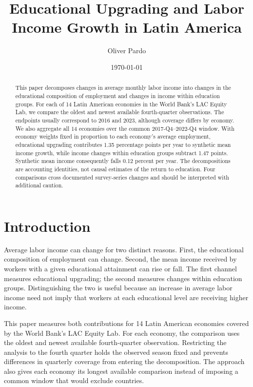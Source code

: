 \documentclass[11pt]{article}
\title{Educational Upgrading and Labor Income Growth in Latin America}
\author{Oliver Pardo}
\date{\today}
\begin{document}
\maketitle

\begin{abstract}
This paper decomposes changes in average monthly labor income into changes in
the educational composition of employment and changes in income within
education groups. For each of 14 Latin American economies in the World Bank's
LAC Equity Lab, we compare the oldest and newest available fourth-quarter
observations. The endpoints usually correspond to 2016 and 2023, although
coverage differs by economy. We also aggregate all 14 economies over the
common 2017-Q4--2022-Q4 window. With economy weights
fixed in proportion to each economy's average employment, educational upgrading contributes 1.35 percentage points
per year to synthetic mean income growth, while income changes within
education groups subtract 1.47 points. Synthetic mean income consequently
falls 0.12 percent per year. The decompositions are accounting identities,
not causal estimates of the return to education. Four comparisons cross
documented survey-series changes and should be interpreted with additional
caution.
\end{abstract}

\section{Introduction}

Average labor income can change for two distinct reasons. First, the
educational composition of employment can change. Second, the mean income
received by workers with a given educational attainment can rise or fall.
The first channel measures educational upgrading; the second measures changes
within education groups. Distinguishing the two is useful because an increase
in average labor income need not imply that workers at each educational level
are receiving higher income.

This paper measures both contributions for 14 Latin American economies
covered by the World Bank's LAC Equity Lab. For each economy, the comparison
uses the oldest and newest available fourth-quarter observation. Restricting
the analysis to the fourth quarter holds the observed season fixed and
prevents differences in quarterly coverage from entering the decomposition.
The approach also gives each economy its longest available comparison instead
of imposing a common window that would exclude countries.
\end{document}
